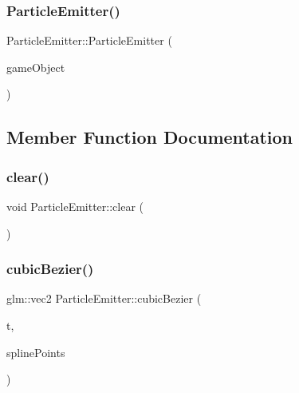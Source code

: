 \subsubsection{\texorpdfstring{Particle\+Emitter()}{ParticleEmitter()}}
{\footnotesize\ttfamily Particle\+Emitter\+::\+Particle\+Emitter (\begin{DoxyParamCaption}\item[{\hyperlink{class_mason_1_1_game_object}{Game\+Object} $\ast$}]{game\+Object }\end{DoxyParamCaption})\hspace{0.3cm}{\ttfamily [protected]}}



\subsection{Member Function Documentation}
\hypertarget{class_mason_1_1_particle_emitter_a14b63dca4ee3812ffb68f8927956683d}{}\label{class_mason_1_1_particle_emitter_a14b63dca4ee3812ffb68f8927956683d} 
\subsubsection{\texorpdfstring{clear()}{clear()}}
{\footnotesize\ttfamily void Particle\+Emitter\+::clear (\begin{DoxyParamCaption}{ }\end{DoxyParamCaption})}

\hypertarget{class_mason_1_1_particle_emitter_a9750a2b4f2f644691822b266359f1c86}{}\label{class_mason_1_1_particle_emitter_a9750a2b4f2f644691822b266359f1c86} 
\subsubsection{\texorpdfstring{cubic\+Bezier()}{cubicBezier()}}
{\footnotesize\ttfamily glm\+::vec2 Particle\+Emitter\+::cubic\+Bezier (\begin{DoxyParamCaption}\item[{float}]{t,  }\item[{std\+::vector$<$ glm\+::vec2 $>$}]{spline\+Points }\end{DoxyParamCaption})\hspace{0.3cm}{\ttfamily [protected]}}

